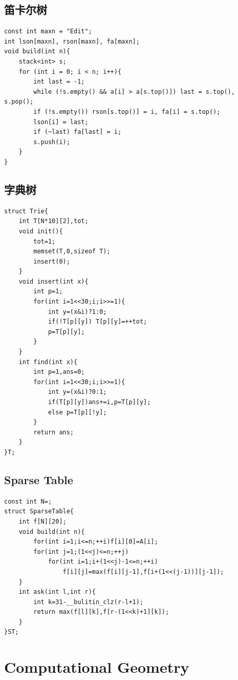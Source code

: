 \documentclass[twoside]{article}
\begin{document}
\subsection{笛卡尔树}
\begin{lstlisting}
const int maxn = "Edit";
int lson[maxn], rson[maxn], fa[maxn];
void build(int n){
    stack<int> s;
    for (int i = 0; i < n; i++){
        int last = -1;
        while (!s.empty() && a[i] > a[s.top()]) last = s.top(), s.pop();
        if (!s.empty()) rson[s.top()] = i, fa[i] = s.top();
        lson[i] = last;
        if (~last) fa[last] = i;
        s.push(i);
    }
}
\end{lstlisting}
\subsection{字典树}
\begin{lstlisting}
struct Trie{
    int T[N*10][2],tot;
    void init(){
        tot=1;
        memset(T,0,sizeof T);
        insert(0);
    }
    void insert(int x){
        int p=1;
        for(int i=1<<30;i;i>>=1){
            int y=(x&i)?1:0;
            if(!T[p][y]) T[p][y]=++tot;
            p=T[p][y];
        }
    }
    int find(int x){
        int p=1,ans=0;
        for(int i=1<<30;i;i>>=1){
            int y=(x&i)?0:1;
            if(T[p][y])ans+=i,p=T[p][y];
            else p=T[p][!y];
        }
        return ans;
    }
}T;
\end{lstlisting}
\subsection{Sparse Table}
\begin{lstlisting}
const int N=;
struct SparseTable{
    int f[N][20];
    void build(int n){
        for(int i=1;i<=n;++i)f[i][0]=A[i];
        for(int j=1;(1<<j)<=n;++j)
            for(int i=1;i+(1<<j)-1<=n;++i)
                f[i][j]=max(f[i][j-1],f[i+(1<<(j-1))][j-1]);
    }
    int ask(int l,int r){
        int k=31-__bulitin_clz(r-l+1);
        return max(f[l][k],f[r-(1<<k)+1][k]);
    }
}ST;
\end{lstlisting}
\clearpage\section{Computational Geometry}
\end{document}
